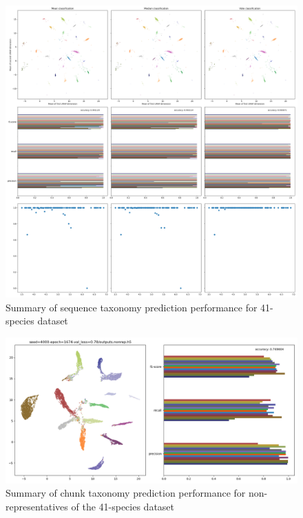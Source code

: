 \documentclass{article}
\begin{document}
\begin{figure}
  \includegraphics[width=\linewidth]{new_journal/figures/ar122_r89.genomic.medium/chunks_W4000_S4000/roznet/o256_g4_b32_lr0.001_16bit_A4/summary.aggregated.png}
  \caption{Summary of sequence taxonomy prediction performance for 41-species dataset}
  \label{fig:summary_aggregated_roznet_medium_training}
\end{figure}

\begin{figure}
  \includegraphics[width=\linewidth]{new_journal/figures/ar122_r89.genomic.medium/chunks_W4000_S4000/roznet/o256_g4_b32_lr0.001_16bit_A4/nonrep/summary.png}
  \caption{Summary of chunk taxonomy prediction performance for non-representatives of the 41-species dataset}
  \label{fig:summary_roznet_medium_nonrep}
\end{figure}
\end{document}
